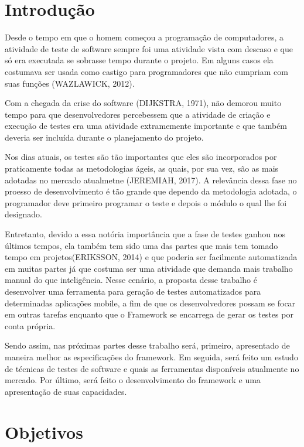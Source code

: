 \documentclass[
  12pt,       %
  openright,      %
  twoside,      %
  a4paper,      %
  english,      %
  french,       %
  spanish,      %
  brazil,       %
  ]{abntex2}
\begin{document}
\chapter*[Introdução]{Introdução}

Desde o tempo em que o homem começou a programação de computadores, a atividade
de teste de software sempre foi uma atividade vista com descaso e que só era
executada se sobrasse tempo durante o projeto. Em alguns casos ela costumava ser
usada como castigo para programadores que não cumpriam com suas funções
(WAZLAWICK, 2012).

Com a chegada da crise do software (DIJKSTRA, 1971), não demorou muito tempo
para que desenvolvedores percebessem que a atividade de criação e execução de
testes era uma atividade extramemente importante e que também deveria ser
incluída durante o planejamento do projeto.

Nos dias atuais, os testes são tão importantes que eles são incorporados
por praticamente todas as metodologias ágeis, as quais, por sua vez,
são as mais adotadas no mercado atualmetne (JEREMIAH, 2017). A relevância dessa fase
no proesso de desenvolvimento é tão grande que dependo da metodologia
adotada, o programador deve primeiro programar o teste e depois o módulo
o qual lhe foi designado.

Entretanto, devido a essa notória importância que a fase de testes ganhou nos
últimos tempos, ela também tem sido uma das partes que mais tem tomado tempo
em projetos(ERIKSSON, 2014) e que poderia ser facilmente automatizada em muitas partes já que
costuma ser uma atividade que demanda mais trabalho manual do que inteligência.
Nesse cenário, a proposta desse trabalho é desenvolver uma ferramenta para
geração de testes automatizados para determinadas aplicações mobile, a fim de
que os desenvolvedores possam se focar em outras tarefas enquanto
que o Framework se encarrega de gerar os testes por conta própria.

Sendo assim, nas próximas partes desse trabalho será, primeiro, apresentado de maneira melhor
as especificações do framework. Em seguida, será feito um estudo de técnicas de testes
de software e quais as ferramentas disponíveis atualmente no mercado. Por último, será feito
o desenvolvimento do framework e uma apresentação de suas capacidades.

\chapter{Objetivos}
\end{document}
